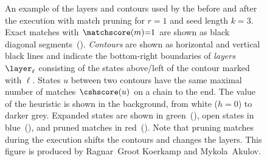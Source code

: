 \begin{figure}[H]
  \centering
  \hspace{0.01\linewidth}
  \caption[Execution of the chaining seed heuristic with pruning]{An example of
  the layers and contours used by the \csh before and after the \A execution
  with match pruning for $r{=}1$ and seed length $k{=}3$. Exact matches with
  ${\matchscore(m){=}1}$ are shown as black diagonal segments~(\blackmatch{}).
  \emph{Contours} are shown as horizontal and vertical black lines and indicate
  the bottom-right boundaries of \emph{layers} $\layer_\ell$ consisting of the
  states above/left of the contour marked with $\ell$. States $u$ between two
  contours have the same maximal number of matches $\cshscore(u)$ on a chain to
  the end. The value of the heuristic is shown in the background, from white
  ($h{=}0$) to darker grey.  Expanded states are shown in
  green~(\greensquare{}), open states in blue~(\bluesquare{}), and pruned
  matches in red~(\redmatch{}). Note that pruning matches during the \A
  execution shifts the contours and changes the layers. This figure is produced
  by Ragnar~Groot Koerkamp and Mykola~Akulov.}
  \label{GLOBALfig:contours}
\end{figure}
